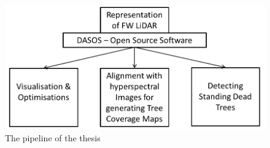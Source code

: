 \documentclass{subfiles}
\begin{document}
\begin{figure}
	\includegraphics[width=\textwidth]{tex/Pipeline/Pipeline.png}
	\caption{The pipeline of the thesis}
\end{figure}
\end{document}
